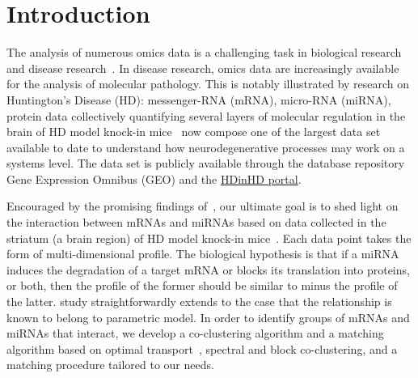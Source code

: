
\section{Introduction}
\label{sec:intro}

The  analysis of  numerous  omics data  is a  challenging  task in  biological
research~\cite{Benayoun19}    and    disease    research~\cite{Langfelder2016,
  Maniatis89}.  In disease research, omics data are increasingly available for
the analysis of  molecular pathology. This is notably  illustrated by research
on Huntington's Disease (HD): messenger-RNA (mRNA), micro-RNA (miRNA), protein
data collectively  quantifying several layers  of molecular regulation  in the
brain  of HD  model  knock-in  mice~\cite{Langfelder2016, Langfelder2018}  now
compose  one of  the largest  data  set available  to date  to understand  how
neurodegenerative processes  may work  on a  systems level.   The data  set is
publicly available  through the database repository  Gene Expression Omnibus
(GEO) and the \href{http://www.HDinHD.org}{HDinHD portal}.
  
Encouraged  by the  promising  findings of~\cite{megret:inserm-02512089},  our
ultimate goal  is to shed  light on the  interaction between mRNAs  and miRNAs
based on data collected in the striatum  (a brain region) of HD model knock-in
mice~\cite{Langfelder2016, Langfelder2018}.  Each data point takes the form of
multi-dimensional profile.  The   biological hypothesis is that if
a miRNA  induces the degradation  of a target  mRNA or blocks  its translation
into proteins, or both, then the  profile of the former should
be similar to minus the profile  of the latter.    study straightforwardly
extends to  the case  that the  relationship is known  to belong  to 
parametric  model.  In  order  to identify  groups of  mRNAs  and miRNAs  that
interact, we develop a co-clustering  algorithm and a matching algorithm based
on  optimal transport~\cite{COT19},  spectral and  block co-clustering,  and a
matching procedure tailored to our needs.


